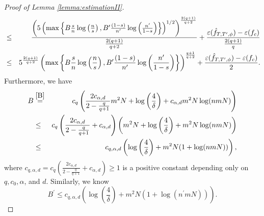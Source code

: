 \documentclass{article}
\begin{document}
\begin{proof}[Proof of Lemma \ref{lemma:estimationII}]
\begin{eqnarray}
&\leq&   \frac{\left( 5\left(  \max\left\{ B \frac{s}{n}
\log \left(\frac{n}{s}\right),B^\prime \frac{(1-s)}{n^\prime}\log \left(\frac{n^\prime}{1-s}\right) \right\} \right)^{1/2}\right)^{\frac{2(q+1)}{q+2}}}{\frac{2(q+1)}{q+2}} + \frac{\varepsilon (\Hat{f}_{T, T^\prime,\phi}) - \varepsilon (f_c)}{\frac{2(q+1)}{q}} \nonumber\\
&\leq&5^{\frac{2(q+1)}{q+2}} \left(  \max\left\{  B\frac{s}{n}
\log \left(\frac{n}{s}\right), B^\prime \frac{(1-s)}{n^\prime}\log \left(\frac{n^\prime}{1-s}\right) \right\} \right)^{\frac{q+1}{q+2}} + \frac{\varepsilon (\Hat{f}_{T, T^\prime,\phi}) - \varepsilon (f_c)}{2}.
\end{eqnarray}
Furthermore, we have 
\begin{eqnarray}\label{Bbound}
    B&\stackrel{\eqref{B}}{=}&c_{q} \left(\frac{2c_{\alpha, d}}{2-{\frac{q}{q+1}}} m^2 N + \log \left(\frac{4}{\delta}\right) + c_{\alpha, d} m^2 N\log(nmN)\right) \nonumber\\
    &\leq& c_{q} \left(\frac{2c_{\alpha, d}}{2-{\frac{q}{q+1}}} + c_{\alpha, d}\right)\left(m^2 N + \log \left(\frac{4}{\delta}\right) + m^2 N\log(nmN)\right)\nonumber\\
     &\leq&  c_{q,\alpha,d}\left(\log \left(\frac{4}{\delta}\right) + m^2 N (1+\log(nmN))\right),
\end{eqnarray}
where $c_{q,\alpha, d} = c_{q} \left(\frac{2c_{\alpha, d}}{2-{\frac{q}{q+1}}} + c_{\alpha, d}\right) \geq 1$ is a positive constant depending only on $q, c_0 , \alpha$, and $d$. 
Similarly, we know 
\begin{equation}\label{Bprimebound}
    B^\prime \leq  c_{q,\alpha,d}\left(\log \left(\frac{4}{\delta}\right) + m^2 N (1+\log(n^\prime mN))\right). 
\end{equation}
 

\end{proof}
\end{document}
